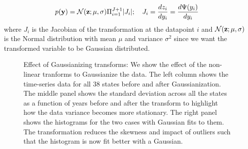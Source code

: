 \documentclass{article}
\def\by{{\bf y}}
\def\bz{{\bf z}}
\begin{document}
\begin{equation}
    p(\by) = \mathcal{N}(\bz; \mu, \sigma) \Pi_{i=1}^{J+1} |J_i|; \quad J_i = \frac{dz_i}{dy_i} =  \frac{d\Psi(y_i)}{dy_i}
    \label{J}
\end{equation}
where $J_i$ is the Jacobian of the transformation at the datapoint $i$ and $\mathcal{N}(\bz; \mu, \sigma)$ is the Normal distribution with mean $\mu$ and variance $\sigma^2$ since we want the transformed variable to be Gaussian distributed. 
\begin{figure}
    \centering
    \caption{Effect of Gaussianizing transforms: We show the effect of the non-linear tranforms to Gaussianize the data. The left column shows the time-series data for all 38 states before and after Gaussianization. The middle panel shows the standard deviation across all the states as a function of years before and after the transform to highlight how the data variance becomes more stationary. The right panel shows the histograms for the two cases with Gaussian fits to them. The transformation reduces the skewness and impact of outliers such that the histogram is now fit better with a Gaussian.  
    }
\label{fig:transform}
\end{figure}
\end{document}
